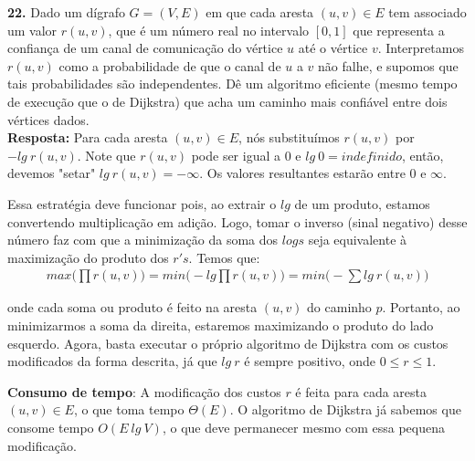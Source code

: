 

\noindent\textbf{22.} Dado um dígrafo $G = (V, E)$ em que cada aresta $(u, v) \in E$ tem associado um valor $r(u, v)$, que é um número real no intervalo $[0, 1]$ que representa a confiança de um canal de comunicação do vértice $u$ até o vértice $v$. Interpretamos $r(u, v)$ como a probabilidade de que o canal de $u$ a $v$ não falhe, e supomos que tais probabilidades são independentes. Dê um algoritmo eficiente (mesmo tempo de execução que o de Dijkstra) que acha um caminho mais confiável entre dois vértices dados.\\[6pt]
\textbf{Resposta:} Para cada aresta $(u, v) \in E$, nós substituímos $r(u, v)$ por $-lg \:{r(u, v)}$. Note que $r(u, v)$ pode ser igual a $0$ e $lg \:0 = indefinido$, então, devemos "setar" $lg \:r(u, v) = -\infty$. Os valores resultantes estarão entre 0 e $\infty$.

Essa estratégia deve funcionar pois, ao extrair o $lg$ de um produto, estamos convertendo multiplicação em adição. Logo, tomar o inverso (sinal negativo) desse número  faz com que a minimização da soma dos $logs$ seja equivalente à maximização do produto dos $r's$. Temos que:
\begin{align*}
max \bigg(\prod r(u, v)\big) = min\bigg(-lg \prod r(u, v)\bigg) = min\bigg(-\sum lg \:r(u, v)\bigg)
\end{align*}

onde cada soma ou produto é feito na aresta $(u, v)$ do caminho $p$. Portanto, ao minimizarmos a soma da direita, estaremos maximizando o produto do lado esquerdo. Agora, basta executar o próprio algoritmo de Dijkstra com os custos modificados da forma descrita, já que $lg \:r$ é sempre positivo, onde $0 \leq r \leq 1$.

\textbf{Consumo de tempo}: A modificação dos custos $r$ é feita para cada aresta $(u, v) \in E$, o que toma tempo $\Theta(E)$. O algoritmo de Dijkstra já sabemos que consome tempo $O(E \:lg \:V)$, o que deve permanecer mesmo com essa pequena modificação.\\[6pt]